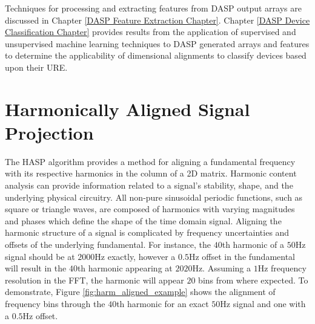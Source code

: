 Techniques for processing and extracting features from DASP output arrays are discussed in Chapter \ref{DASP Feature Extraction Chapter}.  Chapter \ref{DASP Device Classification Chapter} provides results from the application of supervised and unsupervised machine learning techniques to DASP generated arrays and features to determine the applicability of dimensional alignments to classify devices based upon their URE.

\section[Harmonically Aligned Signal Projection (HASP)]{Harmonically Aligned Signal Projection}
\label{Harmonically Aligned Signal Projection}

The HASP algorithm provides a method for aligning a fundamental frequency with its respective harmonics in the column of a 2D matrix.   Harmonic content analysis can provide information related to a signal's stability, shape, and the underlying physical circuitry.  All non-pure sinusoidal periodic functions, such as square or triangle waves, are composed of harmonics with varying magnitudes and phases which define the shape of the time domain signal.  Aligning the harmonic structure of a signal is complicated by frequency uncertainties and offsets of the underlying fundamental.  For instance, the $40$th harmonic of a $50$Hz signal should be at $2000$Hz exactly, however a $0.5$Hz offset in the fundamental will result in the $40$th harmonic appearing at $2020$Hz.  Assuming a $1$Hz frequency resolution in the FFT, the harmonic will appear $20$ bins from where expected. To demonstrate, Figure \ref{fig:harm_aligned_example} shows the alignment of frequency bins through the $40$th harmonic for an exact $50$Hz signal and one with a $0.5$Hz offset. 

